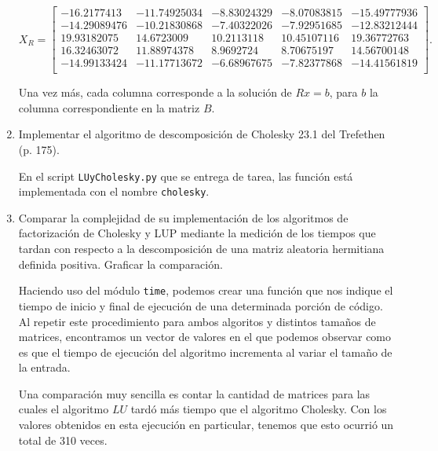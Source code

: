 \documentclass{article}
\begin{document}
\begin{enumerate}
        \begin{equation*}
            X_R = \begin{bmatrix}
                -16.2177413 & -11.74925034 & -8.83024329 & -8.07083815 & -15.49777936\\
                -14.29089476 & -10.21830868 & -7.40322026 & -7.92951685 & -12.83212444\\
                19.93182075 & 14.6723009 & 10.2113118 & 10.45107116 & 19.36772763\\
                16.32463072 & 11.88974378 & 8.9692724 & 8.70675197 & 14.56700148\\
                -14.99133424 & -11.17713672 & -6.68967675 & -7.82377868 & -14.41561819\\
              \end{bmatrix}.
        \end{equation*}

        Una vez más, cada columna corresponde a la solución de $Rx = b$, para $b$ la columna 
        correspondiente en la matriz $B$.

    \item  Implementar el algoritmo de descomposición de Cholesky 23.1 del Trefethen (p. 175).
    
    En el script \texttt{LUyCholesky.py} que se entrega de tarea, las función está implementada
    con el nombre \texttt{cholesky}.

    \item Comparar la complejidad de su implementación de los algoritmos de
    factorización de Cholesky y LUP mediante la medición de los tiempos
    que tardan con respecto a la descomposición de una matriz aleatoria
    hermitiana definida positiva. Graficar la comparación.

    Haciendo uso del módulo \texttt{time}, podemos crear una función que nos indique el tiempo de 
    inicio y final de ejecución de una determinada porción de código. Al repetir este procedimiento
    para ambos algoritos y distintos tamaños de matrices, encontramos un vector de valores en el que
    podemos observar como es que el tiempo de ejecución del algoritmo incrementa al variar el 
    tamaño de la entrada.

    Una comparación muy sencilla es contar la cantidad de matrices para las cuales el algoritmo
    $LU$ tardó más tiempo que el algoritmo Cholesky. Con los valores obtenidos en esta ejecución en
    particular, tenemos que esto ocurrió un total de 310 veces.


\end{enumerate}
\end{document}
